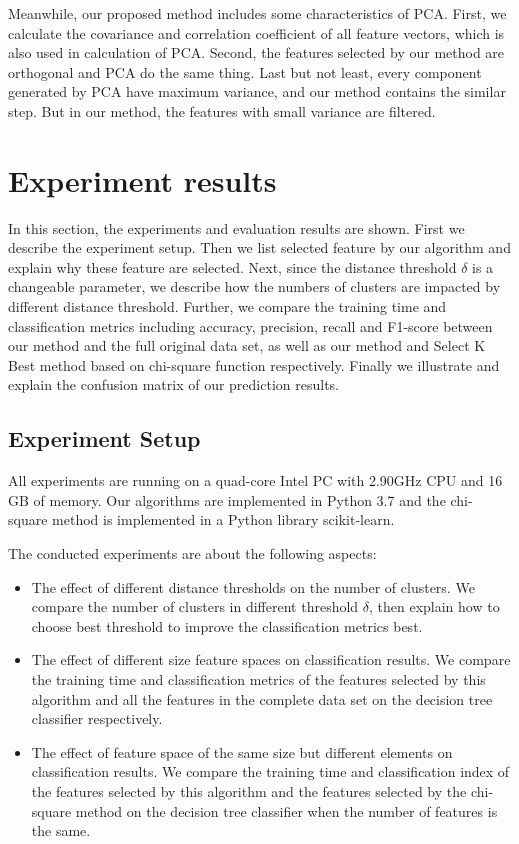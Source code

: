 \documentclass{ieeeaccess}
\theoremstyle{definition}
\begin{document}
Meanwhile, our proposed method includes some characteristics of PCA. First, we calculate the covariance and correlation coefficient of all feature vectors, which is also used in calculation of PCA. Second, the features selected by our method are orthogonal and PCA do the same thing. Last but not least, every component generated by PCA have maximum variance, and our method contains the similar step. But in our method, the features with small variance are filtered.

\section{Experiment results}
\label{sec:evaluation}

In this section, the experiments and evaluation results are shown. First we describe the experiment setup. Then we list selected feature by our algorithm and explain why these feature are selected. Next, since the distance threshold $\delta$ is a changeable parameter, we describe how the numbers of clusters are impacted by different distance threshold. Further, we compare the training time and classification metrics including accuracy, precision, recall and F1-score between our method and the full original data set, as well as our method and Select K Best method based on chi-square function respectively. Finally we illustrate and explain the confusion matrix of our prediction results.

\subsection{Experiment Setup}

All experiments are running on a quad-core Intel PC with 2.90GHz CPU and 16 GB of memory. Our algorithms are implemented in Python 3.7 and the chi-square method is implemented in a Python library scikit-learn\cite{sklearn}.

The conducted experiments are about the following aspects:

\begin{itemize}
    \item The effect of different distance thresholds on the number of clusters. We compare the number of clusters in different threshold $\delta$, then explain how to choose best threshold to improve the classification metrics best.
    \item The effect of different size feature spaces on classification results. We compare the training time and classification metrics of the features selected by this algorithm and all the features in the complete data set on the decision tree classifier respectively.
    \item The effect of feature space of the same size but different elements on classification results. We compare the training time and classification index of the features selected by this algorithm and the features selected by the chi-square method on the decision tree classifier when the number of features is the same.
\end{itemize}
\end{document}
